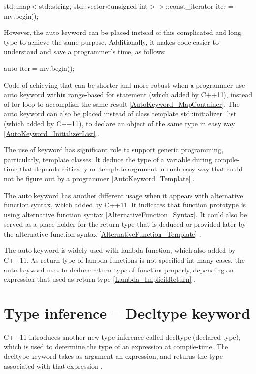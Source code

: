\documentclass[11pt]{report}
\begin{document}
\begin{center}
std::map$<$std::string, std::vector<unsigned int$>>$::const\_iterator iter = mv.begin();
\end{center}

However, the auto keyword can be placed instead of this complicated and long type to achieve the same purpose. Additionally, it makes code easier to understand and save a programmer's time, as follows:

\begin{center}
auto iter = mv.begin();
\end{center}

Code of achieving that can be shorter and more robust when a programmer use auto keyword within range-based for statement (which added by C++11), instead of for loop to accomplish the same result \ref{AutoKeyword_MapContainer}. The auto keyword can also be placed instead of class template std::initializer\_list (which added by C++11), to declare an object of the same type in easy way \ref{AutoKeyword_InitializerList} \cite{Gregorie:professionalcpp}.
\newline

The use of keyword has significant role to support generic programming, particularly, template classes. It deduce the type of a variable  during compile- time that depends critically on template argument in such easy way that could not be figure out by a programmer \ref{AutoKeyword_Template} \cite{Stroustrup:2012:Cpp11}.
\newline

The auto keyword has another different usage when it appears with alternative function syntax, which added by C++11. It indicates that function prototype is using alternative function syntax \ref{AlternativeFunction_Syntax}. It could also be served as a place holder for the return type that is deduced or provided later by the alternative function syntax \ref{AlternativeFunction_Template} \cite{Prata:2012:Cpp}.
\newline

The auto keyword is widely used with lambda function, which also added by C++11. As return type of lambda functions is not specified int many cases, the auto keyword uses to deduce return type of function properly, depending on expression that used as return type \ref{Lambda_ImplicitReturn} \cite{Gregorie:professionalcpp}.

\section{Type inference – Decltype keyword}
\label{section: Decltype keyword}
C++11 introduces another new type inference called decltype (declared type), which is used to determine the type of an expression at compile-time. The decltype keyword takes as argument an expression, and returns the type associated with that expression \cite{Stroustrup:2012:Cpp11}. 
\newline
\end{document}
